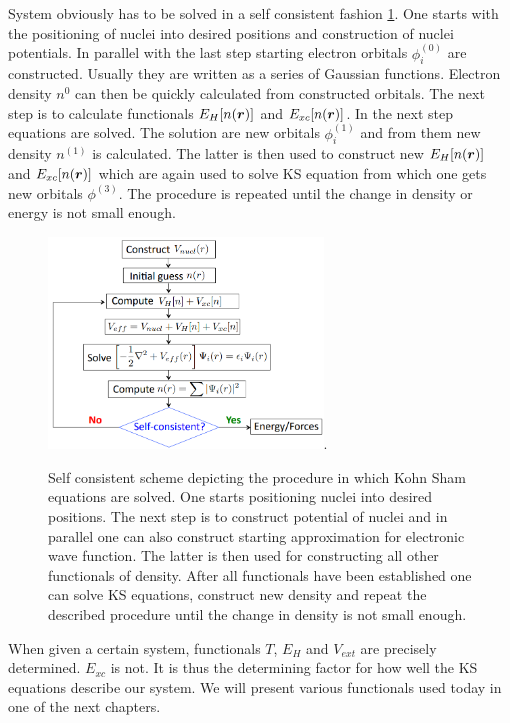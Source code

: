 \documentclass[openany, longbibliography,slovene,a4paper,12pt]{article}
\def\vec#1{\mbox{\boldmath$#1$}}
\begin{document}
System obviously has to be solved in a self consistent fashion
\ref{self_consistent_scheme}. One starts with the positioning of nuclei into
desired positions and construction of nuclei potentials. In parallel with the
last step starting electron orbitals $\phi^{(0)}_i$ are constructed. Usually they are written
as a series of Gaussian functions. Electron density $n^0$ can then be quickly
calculated from constructed orbitals. The next step is to
calculate functionals $E_H[n(\vec r)]$ and $E_{xc}[n(\vec r)]$. In the next step
equations are solved. The solution are new orbitals $\phi_i^{(1)}$  and from
them new density $n^{(1)}$ is calculated. The latter is then used to construct new $E_H[n(\vec r)]$ and $E_{xc}[n(\vec r)]$ which are again used to
solve KS equation from which one gets new orbitals $\phi^{(3)}$. The procedure is
repeated until the change in density or energy is not small enough. 


\begin{figure}
  \centering
  \includegraphics[width=0.65\textwidth]{self_consistent_scheme.png}.
  \caption{Self consistent scheme depicting the procedure in which Kohn Sham
    equations are solved. One starts positioning nuclei into
    desired positions. The next step is to construct potential of nuclei and in
    parallel one can also construct starting approximation for electronic wave
    function. The latter is then used for constructing all other functionals of
    density. After all functionals have been established one can solve KS
    equations, construct new density and repeat the described procedure until
    the change in density is not small enough.
  }
  \label{self_consistent_scheme}
\end{figure}

When given a certain system, functionals $T$, $E_H$ and $V_{ext}$ are precisely
determined. $E_{xc}$ is not. It is thus the determining factor for how well the KS
equations describe our system. We will present various functionals used today in
one of the next chapters.
\end{document}
